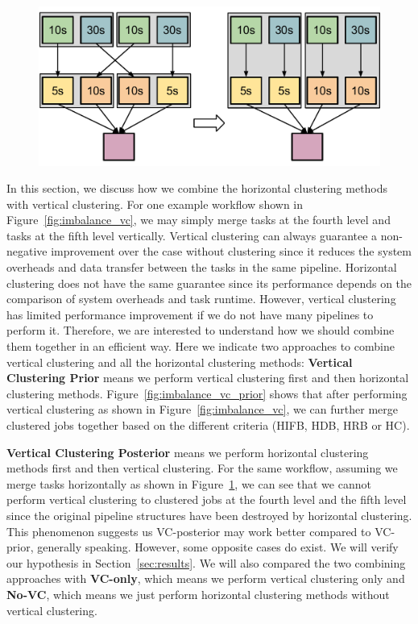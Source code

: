 \begin{figure}[htb]
	\centering
	\includegraphics[width=0.35\linewidth]{figures/imbalance/vertical_clustering_posterior.pdf}
	\label{fig:imbalance_vc_posterior}
\end{figure}

In this section, we discuss how we combine the horizontal clustering methods with vertical clustering. For one example workflow shown in Figure~\ref{fig:imbalance_vc}, we may simply merge tasks at the fourth level and tasks at the fifth level vertically. Vertical clustering can always guarantee a non-negative improvement over the case without clustering since it reduces the system overheads and data transfer between the tasks in the same pipeline. Horizontal clustering does not have the same guarantee since its performance depends on the comparison of system overheads and task runtime. However, vertical clustering has limited performance improvement if we do not have many pipelines to perform it. Therefore, we are interested to understand how we should combine them together in an efficient way. Here we indicate two approaches to combine vertical clustering and all the horizontal clustering methods: 
\textbf{Vertical Clustering Prior} means we perform vertical clustering first and then horizontal clustering methods. Figure~\ref{fig:imbalance_vc_prior} shows that after performing vertical clustering as shown in Figure~\ref{fig:imbalance_vc}, we can further merge clustered jobs together based on the different criteria (HIFB, HDB, HRB or HC). 

\textbf{Vertical Clustering Posterior} means we perform horizontal clustering methods first and then vertical clustering. For the same workflow, assuming we merge tasks horizontally as shown in Figure~\ref{fig:imbalance_vc_posterior}, we can see that we cannot perform vertical clustering to clustered jobs at the fourth level and the fifth level since the original pipeline structures have been destroyed by horizontal clustering. This phenomenon suggests us VC-posterior may work better compared to VC-prior, generally speaking. However, some opposite cases do exist. We will verify our hypothesis in Section~\ref{sec:results}. We will also compared the two combining approaches with \textbf{VC-only}, which means we perform vertical clustering only and \textbf{No-VC}, which means we just perform horizontal clustering methods without vertical clustering. 





